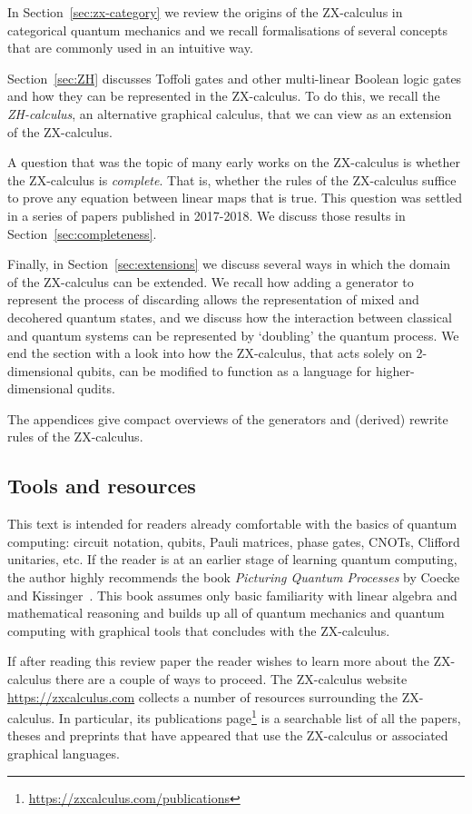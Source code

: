\documentclass[a4paper,onecolumn,superscriptaddress,11pt,%
				unpublished,%
				allowfontchageintitle,%
				]{quantumarticle}
\begin{document}
In Section~\ref{sec:zx-category} we review the origins of the ZX-calculus in categorical quantum mechanics and we recall formalisations of several concepts that are commonly used in an intuitive way.

Section~\ref{sec:ZH} discusses Toffoli gates and other multi-linear Boolean logic gates and how they can be represented in the ZX-calculus. To do this, we recall the \emph{ZH-calculus}, an alternative graphical calculus, that we can view as an extension of the ZX-calculus.

A question that was the topic of many early works on the ZX-calculus is whether the ZX-calculus is \emph{complete}. That is, whether the rules of the ZX-calculus suffice to prove any equation between linear maps that is true. This question was settled in a series of papers published in 2017-2018. We discuss those results in Section~\ref{sec:completeness}.

Finally, in Section~\ref{sec:extensions} we discuss several ways in which the domain of the ZX-calculus can be extended. We recall how adding a generator to represent the process of discarding allows the representation of mixed and decohered quantum states, and we discuss how the interaction between classical and quantum systems can be represented by `doubling' the quantum process. We end the section with a look into how the ZX-calculus, that acts solely on 2-dimensional qubits, can be modified to function as a language for higher-dimensional qudits.

The appendices give compact overviews of the generators and (derived) rewrite rules of the ZX-calculus.

\subsection{Tools and resources}

This text is intended for readers already comfortable with the basics of quantum computing: circuit notation, qubits, Pauli matrices, phase gates, CNOTs, Clifford unitaries, etc. If the reader is at an earlier stage of learning quantum computing, the author highly recommends the book \emph{Picturing Quantum Processes} by Coecke and Kissinger~\cite{CKbook}. This book assumes only basic familiarity with linear algebra and mathematical reasoning and builds up all of quantum mechanics and quantum computing with graphical tools that concludes with the ZX-calculus.

If after reading this review paper the reader wishes to learn more about the ZX-calculus there are a couple of ways to proceed. The ZX-calculus website \url{https://zxcalculus.com} collects a number of resources surrounding the ZX-calculus. In particular, its publications page\footnote{\url{https://zxcalculus.com/publications}} is a searchable list of all the papers, theses and preprints that have appeared that use the ZX-calculus or associated graphical languages.
\end{document}
